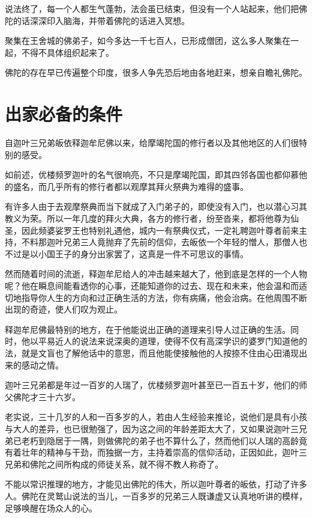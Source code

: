 \documentclass[twoside,openany]{book}
\begin{document}
说法终了，每一个人都生气蓬勃，法会虽已结束，但没有一个人站起来，他们把佛陀的话深深印入脑海，并带着佛陀的话进入冥想。

聚集在王舍城的佛弟子，如今多达一千七百人，已形成僧团，这么多人聚集在一起，不得不具体组织起来了。

佛陀的存在早已传遍整个印度，很多人争先恐后地由各地赶来，想亲自瞻礼佛陀。

\section{出家必备的条件}\label{sec3.8}

自迦叶三兄弟皈依释迦牟尼佛以来，给摩竭陀国的修行者以及其他地区的人们很特别的感受。

如前述，优楼频罗迦叶的名气很响亮，不只是摩竭陀国，即其四邻各国也都仰慕他的盛名，而几乎所有的修行者都以观摩其拜火祭典为难得的盛事。

有许多人由于去观摩祭典而当下就成了入门弟子的，即使没有入门，也以潜心习其教义为荣。所以一年几度的拜火大典，各方的修行者，纷至沓来，都将他尊为仙圣，因此频婆娑罗王也特别礼遇他，城内一有祭典仪式，一定礼聘迦叶尊者前来主持，不料那迦叶兄弟三人竟抛弃了先前的信仰，去皈依一个年轻的憎人，那僧人也不过是以小国王子的身分出家罢了，这真是一件不可思议的事情。

然而随着时间的流逝，释迦牟尼给人的冲击越来越大了，他到底是怎样的一个人物呢？他在瞬息间能看透你的心事，还能知道你的过去、现在和未来，他会温和而适切地指导你人生的方向和过正确生活的方法，你有病痛，他会治病。在他周围不断出现的奇迹，使人们叹为观止。

释迦牟尼佛最特别的地方，在于他能说出正确的道理来引导人过正确的生活。同时，他以平易近人的说法来说深奥的道理，使得不仅有高深学识的婆罗门知道他的法，就是文盲也了解他话中的意思，而且他能使接触他的人按捺不住由心田涌现出来的感动之情。

迦叶三兄弟都是年过一百岁的人瑞了，优楼频罗迦叶甚至已一百五十岁，他们的师父佛陀才三十六岁。

老实说，三十几岁的人和一百多岁的人，若由人生经验来推论，说他们是具有小孩与大人的差异，也已很勉强了，因为这之间的年龄差距太大了，又如果说迦叶三兄弟已老朽到隐居于一隅，则做佛陀的弟子也不算什么了，然而他们以人瑞的高龄竟有着壮年的精神与干劲，而独据一方，主持着崇高的信仰活动，正因如此，迦叶三兄弟和佛陀之间所构成的师徒关系，就不得不教人称奇了。

不能以常识推理的地方，才能见出佛陀的伟大，所以迦叶尊者的皈依，打动了许多人。佛陀在灵鹫山说法的当儿，一百多岁的兄弟三人既谦虚又认真地听讲的模样，足够唤醒在场众人的心。
\end{document}
